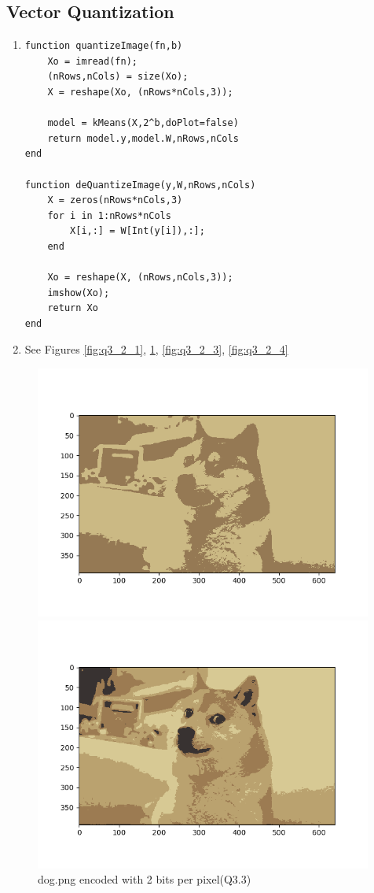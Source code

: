 \documentclass{article}
\begin{document}
\subsection{Vector Quantization}

\begin{enumerate}
\item
\begin{verbatim}
function quantizeImage(fn,b)
    Xo = imread(fn);
    (nRows,nCols) = size(Xo);
    X = reshape(Xo, (nRows*nCols,3));

    model = kMeans(X,2^b,doPlot=false)
    return model.y,model.W,nRows,nCols
end

function deQuantizeImage(y,W,nRows,nCols)
    X = zeros(nRows*nCols,3)
    for i in 1:nRows*nCols
        X[i,:] = W[Int(y[i]),:];
    end

    Xo = reshape(X, (nRows,nCols,3));
    imshow(Xo);
    return Xo
end
\end{verbatim}
\item See Figures \ref{fig:q3_2_1}, \ref{fig:q3_2_2}, \ref{fig:q3_2_3}, \ref{fig:q3_2_4}
\end{enumerate}
\begin{figure}
    \includegraphics[width=30em]{a2_q3_2_1.png}
    \caption{dog.png encoded with 1 bit per pixel(Q.3.3)}
    \label{fig:q3_2_1}

    \includegraphics[width=30em]{a2_q3_2_2.png}
    \caption{dog.png encoded with 2 bits per pixel(Q3.3)}
    \label{fig:q3_2_2}
\end{figure}
\end{document}
